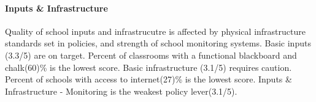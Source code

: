 \documentclass[twocolumn]{article}
\let\oldparagraph\paragraph
\renewcommand{\paragraph}[1]{\oldparagraph{#1}\mbox{}}
\begin{document}
\hypertarget{inputs-infrastructure}{%
\paragraph{\texorpdfstring{\textbf{Inputs \&
Infrastructure}}{Inputs \& Infrastructure}}\label{inputs-infrastructure}}

Quality of school inputs and infrastrucutre is affected by physical
infrastructure standards set in policies, and strength of school
monitoring systems. Basic inputs (3.3/5) are on target. Percent of
classrooms with a functional blackboard and chalk(60)\% is the lowest
score. Basic infrastructure (3.1/5) requires caution. Percent of schools
with access to internet(27)\% is the lowest score. Inputs \&
Infrastructure - Monitoring is the weakest policy lever(3.1/5).
\end{document}
